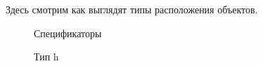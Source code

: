 \documentclass[
  english,
  russian,
  12pt,
  a4paper,
  DIV=11,
  numbers=noendperiod]{scrreprt}
\begin{document}
Здесь смотрим как выглядят типы расположения объектов.

\begin{figure}


\caption{\label{fig-025}Спецификаторы}

\end{figure}%

\begin{figure}


\caption{\label{fig-026}Тип h}

\end{figure}%
\end{document}
